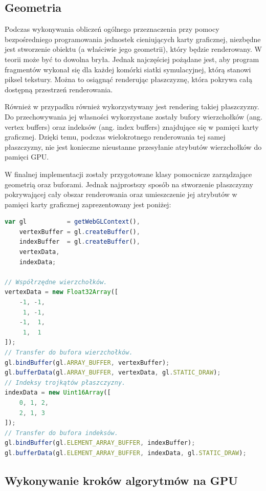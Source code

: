 \subsection{Geometria}

Podczas wykonywania obliczeń ogólnego przeznaczenia przy pomocy bezpośredniego
programowania jednostek cieniujących karty graficznej, niezbędne jest
stworzenie obiektu (a właściwie jego geometrii), który będzie renderowany. W
teorii może być to dowolna bryła. Jednak najczęściej pożądane jest, aby
program fragmentów wykonał się dla każdej komórki siatki symulacyjnej, którą
stanowi piksel tekstury. Można to osiągnąć renderując płaszczyznę, która
pokrywa całą dostępną przestrzeń renderowania.

Również w przypadku \en również wykorzystywany jest rendering takiej
płaszczyzny. Do przechowywania jej własności wykorzystane zostały bufory
wierzchołków (ang. vertex buffers) oraz indeksów (ang. index buffers)
znajdujące się w pamięci karty graficznej. Dzięki temu, podczas wielokrotnego
renderowania tej samej płaszczyzny, nie jest konieczne nieustanne przesyłanie
atrybutów wierzchołków do pamięci GPU.

W finalnej implementacji \en zostały przygotowane klasy pomocnicze
zarządzające geometrią oraz buforami. Jednak najprostszy sposób na stworzenie
płaszczyzny pokrywającej cały obszar renderowania oraz umieszczenie jej
atrybutów w pamięci karty graficznej zaprezentowany jest poniżej:

\begin{lstlisting}[language=JavaScript, caption=Definicja geometrii
płaszczyzny pokrywającej cały obszar renderowania]
var gl           = getWebGLContext(),
    vertexBuffer = gl.createBuffer(),
    indexBuffer  = gl.createBuffer(),
    vertexData,
    indexData;

// Współrzędne wierzchołków.
vertexData = new Float32Array([
    -1, -1, 
     1, -1,
    -1,  1,
     1,  1
]);
// Transfer do bufora wierzchołków.
gl.bindBuffer(gl.ARRAY_BUFFER, vertexBuffer);
gl.bufferData(gl.ARRAY_BUFFER, vertexData, gl.STATIC_DRAW);
// Indeksy trojkątów płaszczyzny.
indexData = new Uint16Array([
    0, 1, 2,
    2, 1, 3
]);
// Transfer do bufora indeksów.
gl.bindBuffer(gl.ELEMENT_ARRAY_BUFFER, indexBuffer);
gl.bufferData(gl.ELEMENT_ARRAY_BUFFER, indexData, gl.STATIC_DRAW);
\end{lstlisting}

\subsection{Wykonywanie kroków algorytmów na GPU}
\label{sec:wykonNaGPU}

